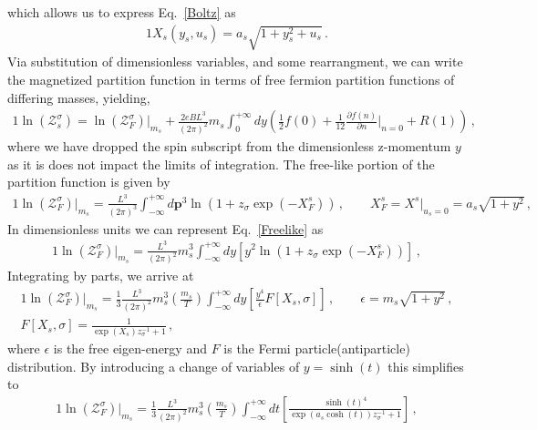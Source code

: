 \documentclass[
aps,
pra,
showpacs,
preprintnumbers,
amsmath,
amssymb,
footinbib
]{revtex4-2}
\newcommand*{\req}[1]{Eq.~{\eqref{#1}}}
\newcommand*{\bb}{\boldsymbol}
\begin{document}
which allows us to express \req{Boltz} as
\begin{alignat}{1}
    \label{UnitlessBoltz} X_{s}(y_{s},u_{s})=a_{s}\sqrt{1+y_{s}^{2}+u_{s}}\,.
\end{alignat}
Via substitution of dimensionless variables, and some rearrangment, we can write the magnetized partition function in terms of free fermion partition functions of differing masses, yielding,
\begin{alignat}{1}
    \label{Equality} \ln\left(\mathcal{Z}^{\sigma}_{s}\right) = \ln\left(\mathcal{Z}^{\sigma}_{F}\right)|_{m_{s}} + \frac{2eBL^{3}}{(2\pi)^{2}}m_{s}\int_{0}^{+\infty}dy\left(\frac{1}{2}f(0) + \frac{1}{12}\frac{\partial f(n)}{\partial n}\bigg\rvert_{n=0} + R(1)\right)\,,
\end{alignat}
where we have dropped the spin subscript from the dimensionless z-momentum $y$ as it is does not impact the limits of integration. The free-like portion of the partition function is given by
\begin{alignat}{1}
    \label{Freelike} \ln\left(\mathcal{Z}^{\sigma}_{F}\right)|_{m_{s}}=\frac{L^{3}}{(2\pi)^{3}}\int^{+\infty}_{-\infty}d\bb{p}^{3}\ln\left(1+z_{\sigma}\exp(-X^{s}_{F})\right)\,,\qquad X^{s}_{F} = X^{s}\vert_{u_{s}=0} = a_{s}\sqrt{1+y^{2}}\,,
\end{alignat}
In dimensionless units we can represent \req{Freelike} as
\begin{alignat}{1}
    \label{FreelikeAlt} \ln\left(\mathcal{Z}^{\sigma}_{F}\right)|_{m_{s}}=\frac{L^{3}}{(2\pi)^{2}}m_{s}^{3}\int^{+\infty}_{-\infty}dy\left[y^{2}\ln\left(1+z_{\sigma}\exp(-X^{s}_{F})\right)\right]\,,
\end{alignat}
Integrating by parts, we arrive at
\begin{alignat}{1}
    \label{FreelikeParts} \ln\left(\mathcal{Z}^{\sigma}_{F}\right)|_{m_{s}}=\frac{1}{3}\frac{L^{3}}{(2\pi)^{2}}m_{s}^{3}\left(\frac{m_{s}}{T}\right)\int^{+\infty}_{-\infty}dy\left[\frac{y^{4}}{\epsilon}F[X_{s},\sigma]\right]\,,\qquad \epsilon=m_{s}\sqrt{1+y^{2}}\,,\\
    \label{FermD} F[X_{s},\sigma] = \frac{1}{\exp(X_{s})z_{\sigma}^{-1}+1}\,,
\end{alignat}
where $\epsilon$ is the free eigen-energy and $F$ is the Fermi particle(antiparticle) distribution. By introducing a change of variables of $y=\sinh(t)$ this simplifies to
\begin{alignat}{1}
    \label{FreelikeFinal} \ln\left(\mathcal{Z}^{\sigma}_{F}\right)|_{m_{s}}=\frac{1}{3}\frac{L^{3}}{(2\pi)^{2}}m_{s}^{3}\left(\frac{m_{s}}{T}\right)\int^{+\infty}_{-\infty}dt\left[\frac{\sinh(t)^{4}}{\exp(a_{s}\cosh(t))z_{\sigma}^{-1}+1}\right]\,,
\end{alignat}
\end{document}
